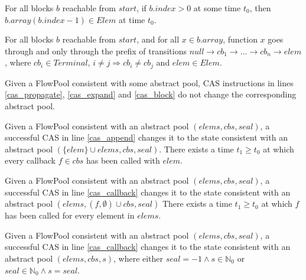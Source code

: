 \documentclass[runningheads,a4paper]{llncs}
\begin{document}
\begin{lemma}
For all blocks $b$ reachable from $start$, if $b.index > 0$ at some time $t_0$, then
$b.array(b.index - 1) \in Elem$ at time $t_0$.
\end{lemma}

\begin{lemma}
For all blocks $b$ reachable from $start$, and for all $x \in b.array$,
function $x$ goes through and only through the prefix of transitions
$null \rightarrow cb_1 \rightarrow \dots \rightarrow cb_n \rightarrow elem$, where
$cb_i \in Terminal$, $i \neq j \Rightarrow cb_i \neq cb_j$ and $elem \in Elem$.
\end{lemma}

%

\begin{lemma}
Given a FlowPool consistent with some abstract
pool, CAS instructions in lines \ref{cas_propagate}, \ref{cas_expand} and
\ref{cas_block} do not change the corresponding abstract pool.
\end{lemma}

\begin{lemma}
Given a FlowPool consistent with an abstract pool $(elems, cbs,
seal)$, a successful CAS in line \ref{cas_append}
changes it to the state consistent with an abstract pool
$(\{elem\} \cup elems, cbs, seal)$.
There exists a time $t_1 \geq t_0$ at which every callback $f \in
cbs$ has been called with $elem$.
\end{lemma}

\begin{lemma}
Given a FlowPool consistent with an abstract pool $(elems, cbs, seal)$, 
a successful CAS in line \ref{cas_callback} changes it 
to the state consistent with an abstract pool $(elems, (f, \emptyset)
\cup cbs, seal)$
There exists a time $t_1 \geq t_0$ at which $f$ has been called for
every element in $elems$.
\end{lemma}

\begin{lemma}
Given a FlowPool consistent with an abstract pool $(elems, cbs, seal)$, 
a successful CAS in line \ref{cas_callback} changes it to the state 
consistent with an abstract pool $(elems, cbs, s)$, where either $seal
= -1 \wedge s \in \mathbb{N}_0$ or $seal \in \mathbb{N}_0 \wedge s = seal$.
\end{lemma}
\end{document}

